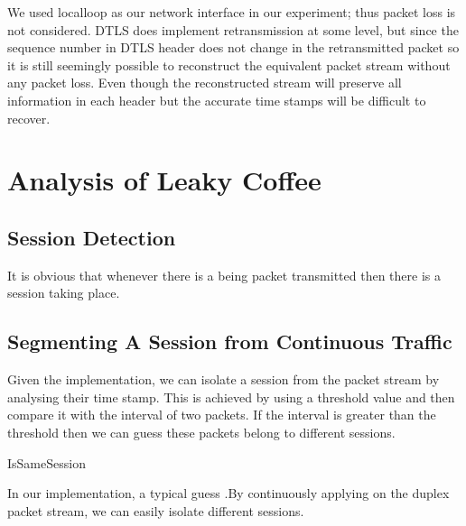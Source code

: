 We used localloop as our network interface in our experiment; thus packet loss is not considered. DTLS does implement retransmission at some level, but since the sequence number in DTLS header does not change in the retransmitted packet so it is still seemingly possible to reconstruct the equivalent packet stream without any packet loss. Even though the reconstructed stream will preserve all information in each header but the accurate time stamps will be difficult to recover.

\section{Analysis of Leaky Coffee}

\subsection{Session Detection}
It is obvious that whenever there is a being packet transmitted then there is a session taking place.

\subsection{Segmenting A Session from Continuous Traffic}
Given the implementation, we can isolate a session from the packet stream by analysing their time stamp. 
This is achieved by using a threshold value and then compare it with the interval of two packets. If the interval is greater than the threshold then we can guess these packets belong to different sessions.

\begin{algorithm}[H]
{
	 {
		\;
	}
	{
	}
}
\caption{IsSameSession}
\label{1}
\end{algorithm}

In our implementation, a typical guess .By continuously applying  on the duplex packet stream, we can easily isolate different sessions.

